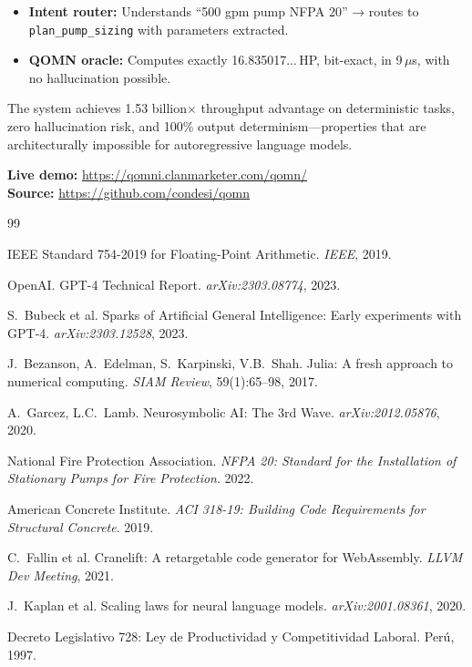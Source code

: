 \documentclass[11pt]{article}
\begin{document}
\begin{itemize}
\item \textbf{Intent router:} Understands ``500 gpm pump NFPA 20'' → routes to
      \texttt{plan\_pump\_sizing} with parameters extracted.
\item \textbf{QOMN oracle:} Computes exactly 16.835017...\,HP, bit-exact,
      in 9\,$\mu$s, with no hallucination possible.
\end{itemize}

The system achieves 1.53 billion$\times$ throughput advantage on deterministic tasks,
zero hallucination risk, and 100\% output determinism---properties that are
architecturally impossible for autoregressive language models.

\textbf{Live demo:} \url{https://qomni.clanmarketer.com/qomn/} \\
\textbf{Source:} \url{https://github.com/condesi/qomn}


\begin{thebibliography}{99}

IEEE Standard 754-2019 for Floating-Point Arithmetic.
\textit{IEEE}, 2019.

OpenAI.
GPT-4 Technical Report.
\textit{arXiv:2303.08774}, 2023.

S.~Bubeck et al.
Sparks of Artificial General Intelligence: Early experiments with GPT-4.
\textit{arXiv:2303.12528}, 2023.

J.~Bezanson, A.~Edelman, S.~Karpinski, V.B.~Shah.
Julia: A fresh approach to numerical computing.
\textit{SIAM Review}, 59(1):65--98, 2017.

A.~Garcez, L.C.~Lamb.
Neurosymbolic AI: The 3rd Wave.
\textit{arXiv:2012.05876}, 2020.

National Fire Protection Association.
\textit{NFPA 20: Standard for the Installation of Stationary Pumps for Fire Protection}.
2022.

American Concrete Institute.
\textit{ACI 318-19: Building Code Requirements for Structural Concrete}.
2019.

C.~Fallin et al.
Cranelift: A retargetable code generator for WebAssembly.
\textit{LLVM Dev Meeting}, 2021.

J.~Kaplan et al.
Scaling laws for neural language models.
\textit{arXiv:2001.08361}, 2020.

Decreto Legislativo 728: Ley de Productividad y Competitividad Laboral.
Per\'u, 1997.

\end{thebibliography}
\end{document}
